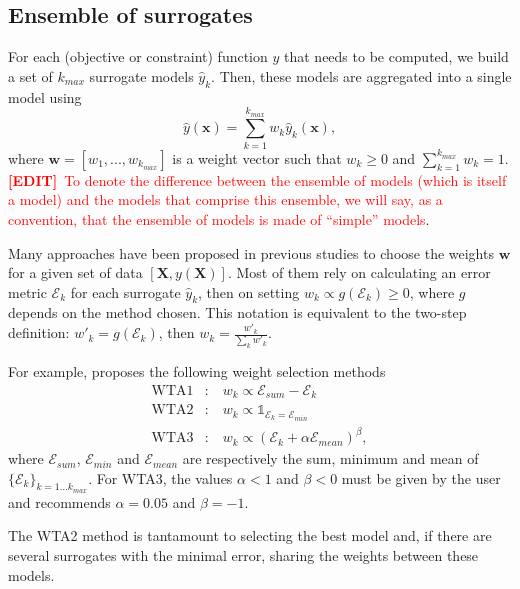 \documentclass[12pt]{article}
\newcommand{\x}{\mathbf{x}}
\newcommand{\w}{\mathbf{w}}
\newcommand{\yh}{\hat{y}}
\newcommand{\kmax}{{k_{max}}}
\newcommand{\X}{\mathbf{X}}
\newcommand{\ind}{\mathbb{1}}
\newcommand{\metric}{\mathcal{E}}
\renewcommand{\quote}[1]{``#1''}
\newcommand{\mynote}[1]{
  \textbf{\underline{Note}:~#1}
}
\renewcommand{\mynote}[1]{\textcolor{red}{\textbf{[EDIT]}~#1}}
\begin{document}
\subsection{Ensemble of surrogates }
\label{sec:ensemble}

For each (objective or constraint) function $y$ that needs to be computed, we build a set of $\kmax$ surrogate models $\yh_k$. Then, these models are aggregated into a single model using
\begin{equation}
  \yh(\x) = \sum_{k=1}^{\kmax} w_k\yh_k(\x),
\end{equation}
where $\w = [w_1,...,w_\kmax]$ is a weight vector such that $w_k\ge0$ and $\sum_{k=1}^{\kmax}w_k=1$. \mynote{To denote the difference between the ensemble of models (which is itself a model) and the models that comprise this ensemble, we will say, as a convention, that the ensemble of models is made of \quote{simple} models}. 


Many approaches have been proposed in previous studies to choose the weights $\w$ for a given set of data $[\X,y(\X)]$. Most of them \cite{VianaEnsemble2008,AcarOptimizedWeight2009,GoelEnsemble2007} rely on calculating an error metric $\metric_k$ for each surrogate $\yh_k$, then on setting $w_k \propto g(\metric_k) \ge 0$, where $g$ depends on the method chosen.
This notation is equivalent to the two-step definition: $w'_k = g(\metric_k)$, then $w_k = \frac{w'_k}{\sum_k w'_k}$.


For example, \cite{GoelEnsemble2007} proposes the following weight selection methods
\begin{align}
\text{WTA1} & : \;\;\; w_k \propto \metric_{sum} - \metric_k \nonumber \\
\text{WTA2} & : \;\;\; w_k \propto \ind_{\metric_k = \metric_{min}} \nonumber \\
\text{WTA3} & : \;\;\; w_k \propto (\metric_k + \alpha \metric_{mean})^\beta, \nonumber
\end{align} 
where $\metric_{sum}$, $\metric_{min}$ and $\metric_{mean}$ are respectively the sum, minimum and mean of $\{\metric_k\}_{k=1...\kmax}$. For WTA3, the values $\alpha<1$ and $\beta<0$ must be given by the user and \cite{GoelEnsemble2007} recommends $\alpha=0.05$ and $\beta=-1$. 

The WTA2 method is tantamount to selecting the best model and, if there are several surrogates with the minimal error, sharing the weights between these models.
\end{document}
